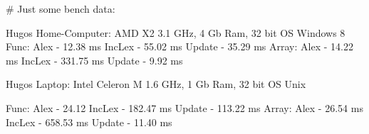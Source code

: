 \# Just some bench data:

Hugos Home-Computer: AMD X2 3.1 GHz, 4 Gb Ram, 32 bit OS Windows 8
Func:
  Alex - 12.38 ms
  IncLex - 55.02 ms
  Update - 35.29 ms
Array:
  Alex - 14.22 ms
  IncLex - 331.75 ms
  Update - 9.92 ms

Hugos Laptop: Intel Celeron M 1.6 GHz, 1 Gb Ram, 32 bit OS Unix

Func:
  Alex - 24.12
  IncLex - 182.47 ms
  Update - 113.22 ms
Array:
  Alex - 26.54 ms
  IncLex - 658.53 ms
  Update - 11.40 ms

